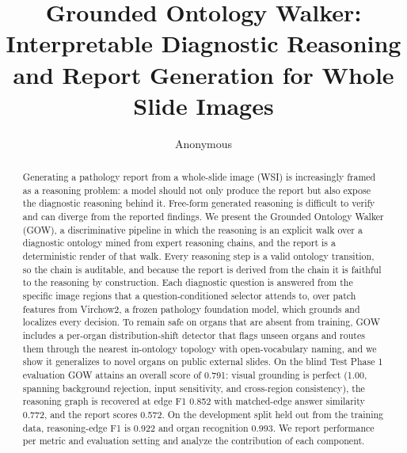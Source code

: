 \documentclass[runningheads]{llncs}
\begin{document}
\title{Grounded Ontology Walker: Interpretable Diagnostic Reasoning and Report Generation for Whole Slide Images}


\author{Anonymous}

\maketitle

\begin{abstract}
Generating a pathology report from a whole-slide image (WSI) is increasingly framed as a reasoning problem:
a model should not only produce the report but also expose the diagnostic reasoning behind it. Free-form
generated reasoning is difficult to verify and can diverge from the reported findings. We present the
Grounded Ontology Walker (GOW), a discriminative pipeline in which the reasoning is an explicit walk over a
diagnostic ontology mined from expert reasoning chains, and the report is a deterministic render of that walk.
Every reasoning step is a valid ontology transition, so the chain is auditable, and because the report is
derived from the chain it is faithful to the reasoning by construction. Each diagnostic question is answered
from the specific image regions that a question-conditioned selector attends to, over patch features from
Virchow2, a frozen pathology foundation model, which grounds and localizes every decision. To remain safe on
organs that are absent from training, GOW includes a per-organ distribution-shift detector that flags unseen
organs and routes them through the nearest in-ontology topology with open-vocabulary naming, and we show it
generalizes to novel organs on public external slides. On the blind Test Phase 1 evaluation GOW attains an
overall score of 0.791: visual grounding is perfect (1.00, spanning background rejection, input sensitivity,
and cross-region consistency), the reasoning graph is recovered at edge F1 0.852 with matched-edge answer
similarity 0.772, and the report scores 0.572. On the development split held out from the training data,
reasoning-edge F1 is 0.922 and organ recognition 0.993. We report performance per metric and evaluation setting
and analyze the contribution of each component.

\end{abstract}
\end{document}
